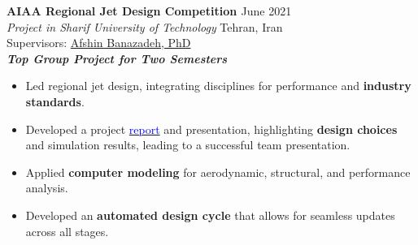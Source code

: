 \documentclass[12pt]{article}
\begin{document}
\vspace{0.2in}
\noindent
{\bfseries AIAA Regional Jet Design Competition
\href{https://github.com/alibaniasad1999/Airplane-Design-II}{\faGithub}
}
\hfill June 2021 \\ 
\noindent \textit{Project in Sharif University of Technology
} \hfill Tehran, Iran \\ 
\noindent Supervisors: 
\href{http://ae.sharif.edu/~portal/faculty/1014037799}{Afshin Banazadeh, PhD} \\
{\footnotesize \textbf{\textit{Top Group Project for Two Semesters \faMedal}}} 
\begin{itemize} %
    \item Led regional jet design, integrating  disciplines for performance and \textbf{industry standards}.
	\item Developed a project \href{https://drive.google.com/drive/folders/1nyzjUDzIgUuoJlB1KRaJeTH69p20cMUK?usp=sharing}{\textcolor{blue}{report}} and presentation, highlighting \textbf{design choices} and simulation results, leading to a successful team presentation.
    \item Applied \textbf{ computer modeling}  for aerodynamic, structural, and performance analysis.
    \item Developed an \textbf{automated design cycle} that allows for seamless updates across all stages.
\end{itemize}








\vspace{0.2in} %


\newpage
\end{document}
